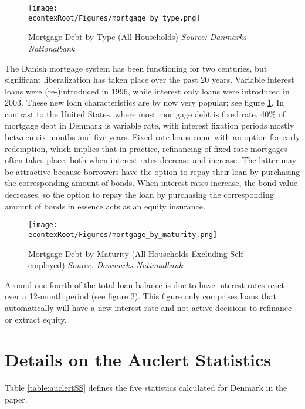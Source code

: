 \documentclass[titlepage]{\econtex}\newcommand{\texname}{ConsumptionHeterogeneity}
\begin{document}
	\begin{figure} 
		\begin{centering}
			\texttt{[image: \\econtexRoot/Figures/mortgage\_by\_type.png]} 
			\caption{Mortgage Debt by Type (All Households) 
	 \emph{\footnotesize {Source: Danmarks Nationalbank}}
}
			\label{fig:mortgage_by_type}
		\end{centering}
	\end{figure}
	
	The Danish mortgage system has been functioning for two centuries, but significant liberalization has taken place over the past 20 years. Variable interest loans were (re-)introduced in 1996, while interest only loans were introduced in 2003. These new loan characteristics are by now very popular; see figure \ref{fig:mortgage_by_type}. In contrast to the United States, where most mortgage debt is fixed rate, 40\% of mortgage debt in Denmark is variable rate, with interest fixation periods mostly between six months and five years. Fixed-rate loans come with an option for early redemption, which implies that in practice, refinancing of fixed-rate mortgages often takes place, both when interest rates decrease and increase. The latter may be attractive because borrowers have the option to repay their loan by purchasing the corresponding amount of bonds. When interest rates increase, the bond value decreases, so the option to repay the loan by purchasing the corresponding amount of bonds in essence acts as an equity insurance.  
	
	\begin{figure} 
		\begin{centering}
			\texttt{[image: \\econtexRoot/Figures/mortgage\_by\_maturity.png]} 
			\caption{Mortgage Debt by Maturity (All Households Excluding Self-employed)
	{ \emph{\footnotesize
			{Source: Danmarks Nationalbank}}
}}
			\label{fig:mortgage_by_maturity}
		\end{centering}
	\end{figure}
	
	Around one-fourth of the total loan balance is due to have interest rates reset over a 12-month period (see figure \ref{fig:mortgage_by_maturity}). This figure only comprises loans that automatically will have a new interest rate and not active decisions to refinance or extract equity. 
	
	\section{Details on the Auclert Statistics}
	\setcounter{figure}{0}   
	\setcounter{table}{0} 
	\label{auclert_appendix}
	Table \ref{table:auclertSS} defines the five statistics calculated for Denmark in the paper.
	
\end{document}
